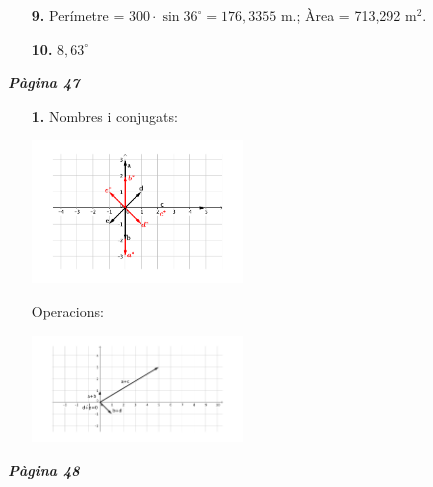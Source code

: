 \documentclass[a4paper, pdf, twoside]{book}
\begin{document}
\begin{multicols}{2}
\begin{enumerate}
\vspace{0.25cm}
\item[\fontfamily{phv}\selectfont\color{blue}\textbf{9. }]  \scalebox{0.6}{\simbolclau } 
Perímetre = $300\cdot \sin 36^\circ = 176,3355$ m.; \quad Àrea = 713,292 m$^2$.
\vspace{0.25cm}
\item[\fontfamily{phv}\selectfont\color{blue}\textbf{10. }]  \scalebox{0.6}{\simbolclau } 
$8,63^\circ $
 \end{enumerate}
\vfill\null
\columnbreak
\def\currentname{Solucions del Tema 4}
\vspace*{0.75cm}

 

\vspace*{0.4cm}
 {}
\vspace{0.3cm}


{\textbf{\em Pàgina 47}} \hrulefill
\begin{enumerate}
\vspace{0.25cm}
\item[\fontfamily{phv}\selectfont\color{blue}\textbf{1. }] 
Nombres i conjugats:\par \includegraphics [width=0.44\textwidth ]{img-sol/t4-1a}\par Operacions:\par \includegraphics [width=0.44\textwidth ]{img-sol/t4-1b}
 \end{enumerate}
\vspace{0.3cm}


{\textbf{\em Pàgina 48}} \hrulefill
\begin{enumerate}
\vspace{0.25cm}



\end{enumerate}
\end{multicols}
\end{document}
